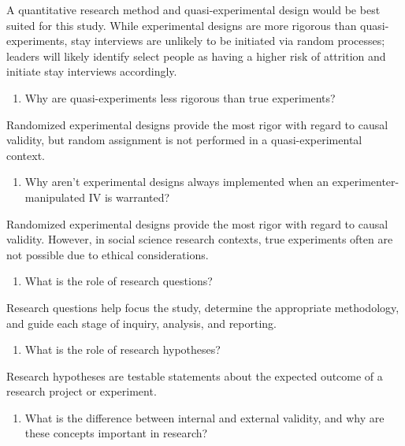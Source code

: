 \documentclass[]{book}
\providecommand{\tightlist}{%
  \setlength{\itemsep}{0pt}\setlength{\parskip}{0pt}}
\begin{document}
A quantitative research method and quasi-experimental design would be best suited for this study. While experimental designs are more rigorous than quasi-experiments, stay interviews are unlikely to be initiated via random processes; leaders will likely identify select people as having a higher risk of attrition and initiate stay interviews accordingly.

\begin{enumerate}
\def\labelenumi{\arabic{enumi}.}
\setcounter{enumi}{1}
\tightlist
\item
  Why are quasi-experiments less rigorous than true experiments?
\end{enumerate}

Randomized experimental designs provide the most rigor with regard to causal validity, but random assignment is not performed in a quasi-experimental context.

\begin{enumerate}
\def\labelenumi{\arabic{enumi}.}
\setcounter{enumi}{2}
\tightlist
\item
  Why aren't experimental designs always implemented when an experimenter-manipulated IV is warranted?
\end{enumerate}

Randomized experimental designs provide the most rigor with regard to causal validity. However, in social science research contexts, true experiments often are not possible due to ethical considerations.

\begin{enumerate}
\def\labelenumi{\arabic{enumi}.}
\setcounter{enumi}{3}
\tightlist
\item
  What is the role of research questions?
\end{enumerate}

Research questions help focus the study, determine the appropriate methodology, and guide each stage of inquiry, analysis, and reporting.

\begin{enumerate}
\def\labelenumi{\arabic{enumi}.}
\setcounter{enumi}{4}
\tightlist
\item
  What is the role of research hypotheses?
\end{enumerate}

Research hypotheses are testable statements about the expected outcome of a research project or experiment.

\begin{enumerate}
\def\labelenumi{\arabic{enumi}.}
\setcounter{enumi}{5}
\tightlist
\item
  What is the difference between internal and external validity, and why are these concepts important in research?
\end{enumerate}
\end{document}
